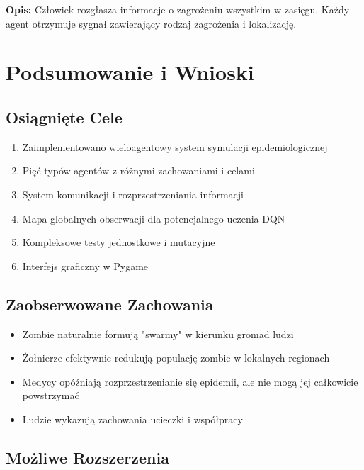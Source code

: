 \documentclass[12pt,a4paper]{article}
\begin{document}
\textbf{Opis:} Człowiek rozgłasza informacje o zagrożeniu wszystkim w zasięgu. Każdy agent otrzymuje sygnał zawierający rodzaj zagrożenia i lokalizację.

\newpage

\section{Podsumowanie i Wnioski}

\subsection{Osiągnięte Cele}

\begin{enumerate}
	\item [\checkmark] Zaimplementowano wieloagentowy system symulacji epidemiologicznej
	\item [\checkmark] Pięć typów agentów z różnymi zachowaniami i celami
	\item [\checkmark] System komunikacji i rozprzestrzeniania informacji
	\item [\checkmark] Mapa globalnych obserwacji dla potencjalnego uczenia DQN
	\item [\checkmark] Kompleksowe testy jednostkowe i mutacyjne
	\item [\checkmark] Interfejs graficzny w Pygame
\end{enumerate}

\subsection{Zaobserwowane Zachowania}

\begin{itemize}
	\item Zombie naturalnie formują "swarmy" w kierunku gromad ludzi
	\item Żołnierze efektywnie redukują populację zombie w lokalnych regionach
	\item Medycy opóźniają rozprzestrzenianie się epidemii, ale nie mogą jej całkowicie
	      powstrzymać
	\item Ludzie wykazują zachowania ucieczki i współpracy
\end{itemize}

\subsection{Możliwe Rozszerzenia}
\end{document}

